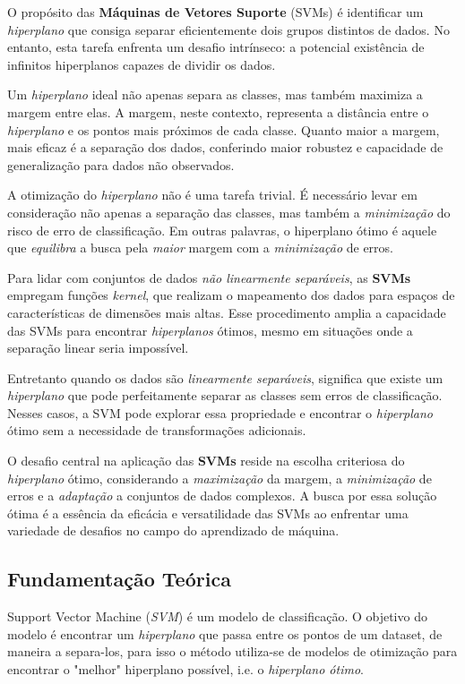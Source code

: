 \documentclass{article}
\begin{document}
O propósito das \textbf{Máquinas de Vetores Suporte} (SVMs) é identificar um \textit{hiperplano} que consiga separar eficientemente dois grupos distintos de dados. No entanto, esta tarefa enfrenta um desafio intrínseco: a potencial existência de infinitos hiperplanos capazes de dividir os dados.

Um \textit{hiperplano} ideal não apenas separa as classes, mas também maximiza a margem entre elas. A margem, neste contexto, representa a distância entre o \textit{hiperplano} e os pontos mais próximos de cada classe. Quanto maior a margem, mais eficaz é a separação dos dados, conferindo maior robustez e capacidade de generalização para dados não observados.

A otimização do \textit{hiperplano} não é uma tarefa trivial. É necessário levar em consideração não apenas a separação das classes, mas também a \textit{minimização} do risco de erro de classificação. Em outras palavras, o hiperplano ótimo é aquele que \textit{equilibra} a busca pela \textit{maior} margem com a \textit{minimização} de erros.

Para lidar com conjuntos de dados \textit{não linearmente separáveis}, as \textbf{SVMs} empregam funções \textit{kernel}, que realizam o mapeamento dos dados para espaços de características de dimensões mais altas. Esse procedimento amplia a capacidade das SVMs para encontrar \textit{hiperplanos} ótimos, mesmo em situações onde a separação linear seria impossível.

Entretanto quando os dados são \textit{linearmente separáveis}, significa que existe um \textit{hiperplano} que pode perfeitamente separar as classes sem erros de classificação. Nesses casos, a SVM pode explorar essa propriedade e encontrar o \textit{hiperplano} ótimo sem a necessidade de transformações adicionais.

O desafio central na aplicação das \textbf{SVMs} reside na escolha criteriosa do \textit{hiperplano} ótimo, considerando a \textit{maximização} da margem, a \textit{minimização} de erros e a \textit{adaptação} a conjuntos de dados complexos. A busca por essa solução ótima é a essência da eficácia e versatilidade das SVMs ao enfrentar uma variedade de desafios no campo do aprendizado de máquina.

\subsection{Fundamentação Teórica}
Support Vector Machine (\textit{SVM}) é um modelo de classificação.
O objetivo do modelo é encontrar um \textit{hiperplano} que passa entre os pontos de um dataset, de maneira a separa-los, para isso o método utiliza-se de modelos de otimização para encontrar o "melhor" hiperplano possível, i.e. o \textit{hiperplano ótimo}. 
\end{document}
